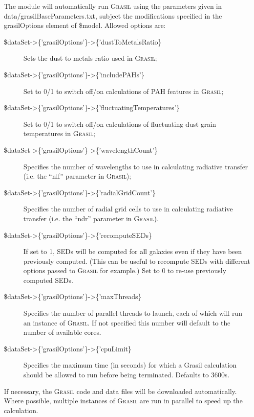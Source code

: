 The module will automatically run {\normalfont \scshape Grasil} using the parameters given in {\normalfont \ttfamily data/grasilBaseParameters.txt}, subject the modifications specified in the {\normalfont \ttfamily grasilOptions} element of {\normalfont \ttfamily \$model}. Allowed options are:
\begin{description}
 \item [{\normalfont \ttfamily \$dataSet-\textgreater\{'grasilOptions'\}-\textgreater\{'dustToMetalsRatio\}}] Sets the dust to metals ratio used in {\normalfont \scshape Grasil};
 \item [{\normalfont \ttfamily \$dataSet-\textgreater\{'grasilOptions'\}-\textgreater\{'includePAHs'\}}] Set to 0/1 to switch off/on calculations of PAH features in {\normalfont \scshape Grasil};
 \item [{\normalfont \ttfamily \$dataSet-\textgreater\{'grasilOptions'\}-\textgreater\{'fluctuatingTemperatures'\}}] Set to 0/1 to switch off/on calculations of fluctuating dust grain temperatures in {\normalfont \scshape Grasil};
 \item [{\normalfont \ttfamily \$dataSet-\textgreater\{'grasilOptions'\}-\textgreater\{'wavelengthCount'\}}] Specifies the number of wavelengths to use in calculating radiative transfer (i.e. the ``{\normalfont \ttfamily nlf}'' parameter in {\normalfont \scshape Grasil});
 \item [{\normalfont \ttfamily \$dataSet-\textgreater\{'grasilOptions'\}-\textgreater\{'radialGridCount'\}}] Specifies the number of radial grid cells to use in calculating radiative transfer (i.e. the ``{\normalfont \ttfamily ndr}'' parameter in {\normalfont \scshape Grasil}).
 \item [{\normalfont \ttfamily \$dataSet-\textgreater\{'grasilOptions'\}-\textgreater\{'recomputeSEDs\}}] If set to 1, SEDs will be computed for all galaxies even if they have been previously computed. (This can be useful to recompute SEDs with different options passed to {\normalfont \scshape Grasil} for example.) Set to 0 to re-use previously computed SEDs.
 \item [{\normalfont \ttfamily \$dataSet-\textgreater\{'grasilOptions'\}-\textgreater\{'maxThreads\}}] Specifies the number of parallel threads to launch, each of which will run an instance of {\normalfont \scshape Grasil}. If not specified this number will default to the number of available cores.
 \item [{\normalfont \ttfamily \$dataSet-\textgreater\{'grasilOptions'\}-\textgreater\{'cpuLimit\}}] Specifies the maximum time (in seconds) for which a Grasil calculation should be allowed to run before being terminated. Defaults to 3600s.
\end{description}
If necessary, the {\normalfont \scshape Grasil} code and data files will be downloaded automatically. Where possible, multiple instances of {\normalfont \scshape Grasil} are run in parallel to speed up the calculation.

